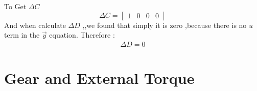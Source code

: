 \documentclass{article}
\begin{document}
To Get $\Delta C $
\begin{equation}
	\Delta C =
	\begin{bmatrix}
		1 & 0 & 0 & 0
	\end{bmatrix}
\end{equation}
And when calculate $\Delta D $ ,,we found that simply it is zero ,because there is no $u$ term in the $\vec{y}$ equation.
Therefore :
\begin{equation}
	\begin{split}
		\Delta D = 0
	\end{split}
\end{equation}
\newpage
\section{Gear and External Torque}
\end{document}
